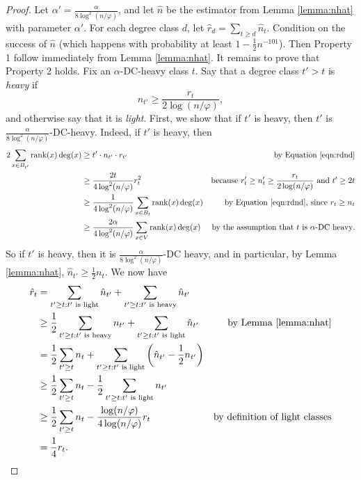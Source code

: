 \documentclass[letterpaper,11pt]{article}
\newcommand{\rank}{\mathrm{rank}}
\theoremstyle{plain}
\theoremstyle{definition}
\theoremstyle{remark}
\begin{document}
\begin{proof}
Let $\alpha' = \frac{\alpha}{8\log^2 (n/\varphi)}$, and let $\hat{n}$ be the estimator from Lemma \ref{lemma:nhat} with parameter $\alpha'$. For each degree class $d$, let $\hat{r}_d = \sum_{t \geq d} \hat{n}_t$. Condition on the success of $\hat{n}$ (which happens with probability at least $1-\frac{1}{2}n^{-101}$). Then Property 1 follow immediately from Lemma \ref{lemma:nhat}. It remains to prove that Property 2 holds. Fix an $\alpha$-DC-heavy class $t$. Say that a degree class $t' > t$  is \emph{heavy} if 
\[n_{t'} \geq \frac{r_t}{2 \log (n/\varphi)},\] and otherwise say that it is \emph{light}.  First, we show that if $t'$ is heavy, then $t'$ is $\frac{\alpha}{8\log^2 (n/\varphi)}$-DC-heavy. 
Indeed, if $t'$ is heavy, then
\begin{align*}
 2 \sum_{x \in B_{t'}} \rank(x) \deg(x) & \geq t'\cdot n_{t'}\cdot r_{t'}  & \text{by Equation \eqref{eqn:rdnd}} \\
& \geq \frac{2t}{4 \log^2 (n/\varphi)}  r_t ^2 & \text{because $r_t' \geq n_t'  \geq \frac{r_t}{2 \log (n/\varphi)}$ and $t'\geq 2t$}\\
&  \geq  \frac{1}{4 \log^2 (n/\varphi)}\sum_{x \in B_t} \rank(x) \deg(x) & \text{by Equation \eqref{eqn:rdnd}, since $r_t \geq n_t$} \\
& \geq \frac{2\alpha}{4 \log^2 (n/\varphi)}\sum_{x \in V} \rank(x) \deg(x)& \text{by the assumption that $t$ is $\alpha$-DC heavy}.
\end{align*}
So if $t'$ is heavy, then it is $\frac{\alpha}{8 \log^2 (n/\varphi)}$-DC heavy, and in particular, by Lemma \ref{lemma:nhat}, $\hat{n}_{t'} \geq \frac{1}{2}n_t$. 
We now have 
\begin{align*}
\hat{r}_t & =  \sum_{t' \geq t: t' \text{ is light}}\hat{n}_{t'} +  \sum_{t' \geq t: t' \text{ is heavy}}\hat{n}_{t'}  & \\
& \geq \frac{1}{2} \sum_{t' \geq t: t' \text{ is heavy}}n_{t'} +  \sum_{t' \geq t: t' \text{ is light}}\hat{n}_{t'}&  \text{by Lemma \ref{lemma:nhat}}\\
& =  \frac{1}{2}\sum_{t' \geq t}n_t + \sum_{t' \geq t: t' \text{ is light}}\left(\hat{n}_{t'} -\frac{1}{2}n_{t'}\right)&  \\
& \geq \frac{1}{2}\sum_{t' \geq t}n_t - \frac{1}{2}\sum_{t' \geq t: t' \text{ is light}}n_{t'}& \\
& \geq \frac{1}{2}\sum_{t' \geq t}n_t - \frac{\log (n/\varphi)}{4 \log (n/\varphi)}r_{t} & \text{by definition of light classes} \\
& = \frac{1}{4}r_t. & 
\end{align*}
\end{proof}
\end{document}
